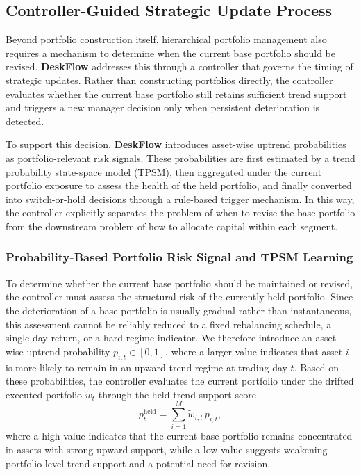 \documentclass[letterpaper]{article} %
\begin{document}
\subsection{Controller-Guided Strategic Update Process}

Beyond portfolio construction itself, hierarchical portfolio management also requires a mechanism to determine when the current base portfolio should be revised. \textbf{DeskFlow} addresses this through a controller that governs the timing of strategic updates. Rather than constructing portfolios directly, the controller evaluates whether the current base portfolio still retains sufficient trend support and triggers a new manager decision only when persistent deterioration is detected.

To support this decision, \textbf{DeskFlow} introduces asset-wise uptrend probabilities as portfolio-relevant risk signals. These probabilities are first estimated by a trend probability state-space model (TPSM), then aggregated under the current portfolio exposure to assess the health of the held portfolio, and finally converted into switch-or-hold decisions through a rule-based trigger mechanism. In this way, the controller explicitly separates the problem of when to revise the base portfolio from the downstream problem of how to allocate capital within each segment.

\subsubsection{Probability-Based Portfolio Risk Signal and TPSM Learning}

To determine whether the current base portfolio should be maintained or revised, the controller must assess the structural risk of the currently held portfolio. Since the deterioration of a base portfolio is usually gradual rather than instantaneous, this assessment cannot be reliably reduced to a fixed rebalancing schedule, a single-day return, or a hard regime indicator. We therefore introduce an asset-wise uptrend probability \(p_{i,t}\in[0,1]\), where a larger value indicates that asset \(i\) is more likely to remain in an upward-trend regime at trading day \(t\). Based on these probabilities, the controller evaluates the current portfolio under the drifted executed portfolio \(\tilde w_t\) through the held-trend support score
\[
p_t^{\mathrm{held}}=\sum_{i=1}^{M}\tilde w_{i,t}\,p_{i,t},
\]
where a high value indicates that the current base portfolio remains concentrated in assets with strong upward support, while a low value suggests weakening portfolio-level trend support and a potential need for revision.
\end{document}
